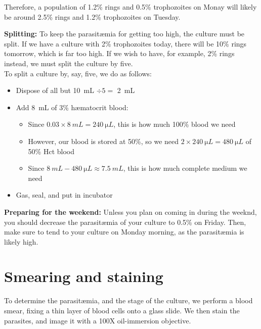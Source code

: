 \documentclass{article}
\begin{document}
Therefore, a population of 1.2\% rings and 0.5\% trophozoites on Monay will likely be around 2.5\% rings and 1.2\% trophozoites on Tuesday.

\textbf{Splitting:}
To keep the parasit{\ae}mia for getting too high, the culture must be split. If we have a culture with 2\% trophozoites today, there will be 10\% rings tomorrow, which is far too high. If we wish to have, for example, 2\% rings instead, we must split the culture by five.\\

To split a culture by, say, five, we do as follows:

\begin{itemize}
	\item Dispose of all but \SI{10}{mL} $\div 5 = $ \SI{2}{mL}
	\item Add \SI{8}{mL} of 3\% h{\ae}matocrit blood:
	\begin{itemize}
		\item Since $0.03 \times \SI{8}{mL} = \SI{240}{\micro L}$, this is how much 100\% blood we need
		\item However, our blood is stored at 50\%, so we need $2 \times \SI{240}{\micro L} = \SI{480}{\micro L}$ of 50\% Hct blood
		\item Since $\SI{8}{mL} - \SI{480}{\micro L} \approx \SI{7.5}{mL}$, this is how much complete medium we need
	\end{itemize}
	\item Gas, seal, and put in incubator
\end{itemize}

\textbf{Preparing for the weekend:}
Unless you plan on coming in during the weeknd, you should decrease the parasit{\ae}mia of your culture to 0.5\% on Friday. Then, make sure to tend to your culture on Monday morning, as the parasit{\ae}mia is likely high.

\newpage
\section{Smearing and staining}

To determine the parasit{\ae}mia, and the stage of the culture, we perform a blood smear, fixing a thin layer of blood cells onto a glass slide. We then stain the parasites, and image it with a 100X oil-immersion objective.
\end{document}
